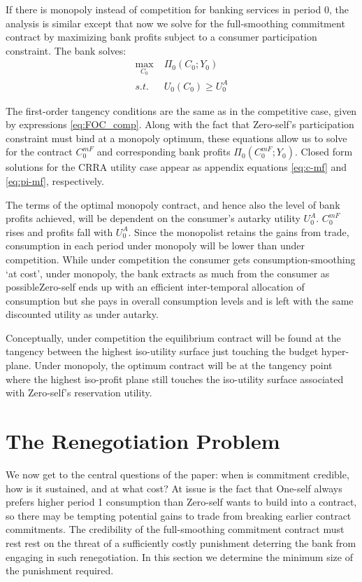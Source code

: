\documentclass[11pt,english]{article}
\theoremstyle{plain}
\theoremstyle{definition}
\begin{document}
\label{sec:own}

If there is monopoly instead of competition for banking services in
period 0, the analysis is similar except that now we solve for the
full-smoothing commitment contract by maximizing bank profits subject
to a consumer participation constraint. The bank solves: 
\begin{align}
\max_{C_{0}} & \;\Pi_{0}\left(C_{0};Y_{0}\right)\label{eq:monop-obj}\\
s.t. & \;U_{0}\left(C_{0}\right)\geq U_{0}^{A}\label{eq:CPC0}
\end{align}

The first-order tangency conditions are the same as in the competitive
case, given by expressions \ref{eq:FOC_comp}. Along with the fact
that Zero-self's participation constraint must bind at a monopoly
optimum, these equations allow us to solve for the contract $C_{0}^{mF}$
and corresponding bank profits $\Pi_{0}\left(C_{0}^{mF};Y_{0}\right)$.
Closed form solutions for the CRRA utility case appear as appendix
equations \ref{eq:c-mf} and \ref{eq:pi-mf}, respectively. 

The terms of the optimal monopoly contract, and hence also the level
of bank profits achieved, will be dependent on the consumer's autarky
utility $U_{0}^{A}$. $C_{0}^{mF}$ rises and profits fall with $U_{0}^{A}$.
Since the monopolist retains the gains from trade, consumption in
each period under monopoly will be lower than under competition. While
under competition the consumer gets consumption-smoothing `at cost',
under monopoly, the bank extracts as much from the consumer as possible\textendash Zero-self
ends up with an efficient inter-temporal allocation of consumption
but she pays in overall consumption levels and is left with the same
discounted utility as under autarky.

Conceptually, under competition the equilibrium contract will be found
at the tangency between the highest iso-utility surface just touching
the budget hyper-plane. Under monopoly, the optimum contract will
be at the tangency point where the highest iso-profit plane still
touches the iso-utility surface associated with Zero-self's reservation
utility.

\section{The Renegotiation Problem}

We now get to the central questions of the paper: when is commitment
credible, how is it sustained, and at what cost? At issue is the fact
that One-self always prefers higher period 1 consumption than Zero-self
wants to build into a contract, so there may be tempting potential
gains to trade from breaking earlier contract commitments. The credibility
of the full-smoothing commitment contract must rest rest on the threat
of a sufficiently costly punishment deterring the bank from engaging
in such renegotiation. In this section we determine the minimum size
of the punishment required.
\end{document}
